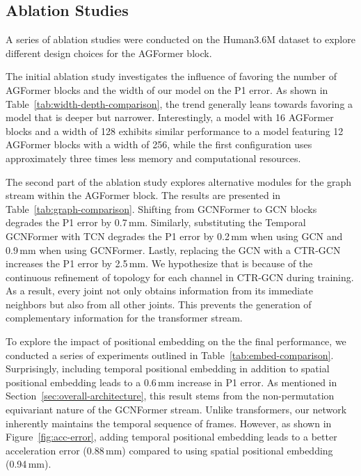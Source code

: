 \documentclass[10pt,twocolumn,letterpaper]{article}
\begin{document}
    

 
    \subsection{Ablation Studies}
    \label{sec:ablation}
    A series of ablation studies were conducted on the Human3.6M dataset to explore different design choices for the AGFormer block.



    The initial ablation study investigates the influence of favoring the number of AGFormer blocks and the width of our model on the P1 error. As shown in Table~\ref{tab:width-depth-comparison}, the trend generally leans towards favoring a model that is deeper but narrower. Interestingly, a model with 16 AGFormer blocks and a width of 128 exhibits similar performance to a model featuring 12 AGFormer blocks with a width of 256, while the first configuration uses approximately three times less memory and computational resources.
    
    The second part of the ablation study explores alternative modules for the graph stream within the AGFormer block. The results are presented in Table~\ref{tab:graph-comparison}. Shifting from GCNFormer to GCN blocks degrades the P1 error by 0.7\,mm. Similarly, substituting the Temporal GCNFormer with TCN degrades the P1 error by 0.2\,mm when using GCN and 0.9\,mm when using GCNFormer. Lastly, replacing the GCN with a CTR-GCN~\cite{ctrn-gcn} increases the P1 error by 2.5\,mm. We hypothesize that is because of the continuous refinement of topology for each channel in CTR-GCN during training. As a result, every joint not only obtains information from its immediate neighbors but also from all other joints. This prevents the generation of complementary information for the transformer stream.

    To explore the impact of positional embedding on the the final performance, we conducted a series of experiments outlined in Table~\ref{tab:embed-comparison}. Surprisingly, including temporal positional embedding in addition to spatial positional embedding leads to a 0.6\,mm increase in P1 error. As mentioned in Section~\ref{sec:overall-architecture}, this result stems from the non-permutation equivariant nature of the GCNFormer stream. Unlike transformers, our network inherently maintains the temporal sequence of frames. However, as shown in Figure~\ref{fig:acc-error}, adding temporal positional embedding leads to a better acceleration error (0.88\,mm) compared to using spatial positional embedding (0.94\,mm).
\end{document}
